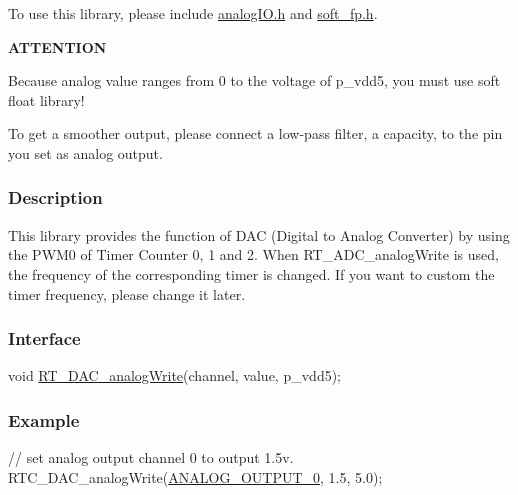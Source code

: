 To use this library, please include {\ttfamily \mbox{\hyperlink{a00005}{analog\+I\+O.\+h}}} and {\ttfamily \mbox{\hyperlink{a00077}{soft\+\_\+fp.\+h}}}.

{\bfseries A\+T\+T\+E\+N\+T\+I\+ON}


\begin{DoxyItemize}
\item Because analog value ranges from 0 to the voltage of p\+\_\+vdd5, you must use soft float library!
\item To get a smoother output, please connect a low-\/pass filter, a capacity, to the pin you set as analog output.
\end{DoxyItemize}

\subsubsection*{Description}

This library provides the function of D\+AC (Digital to Analog Converter) by using the P\+W\+M0 of Timer Counter 0, 1 and 2. When {\ttfamily R\+T\+\_\+\+A\+D\+C\+\_\+analog\+Write} is used, the frequency of the corresponding timer is changed. If you want to custom the timer frequency, please change it later.

\subsubsection*{Interface}


\begin{DoxyCode}
\textcolor{keywordtype}{void} \mbox{\hyperlink{a00005_ab44c37130776b81ef554d8967fcf9e62}{RT\_DAC\_analogWrite}}(channel, value, p\_vdd5);
\end{DoxyCode}


\subsubsection*{Example}


\begin{DoxyCode}
\textcolor{comment}{// set analog output channel 0 to output 1.5v.}
RTC\_DAC\_analogWrite(\mbox{\hyperlink{a00005_a289f8eaf16192ee4a8c7db77fce3bcf3}{ANALOG\_OUTPUT\_0}}, 1.5, 5.0);
\end{DoxyCode}
 
